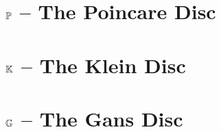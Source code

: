 \documentclass{memoir}
\begin{document}
  \section{\(\mathbb{P}\) -- The Poincare Disc}
    
    \newpage

  \section{\(\mathbb{K}\) -- The Klein Disc}
    
    \newpage

  \section{\(\mathbb{G}\) -- The Gans Disc}
    


\backmatter
  
  

  \printindex
\end{document}
